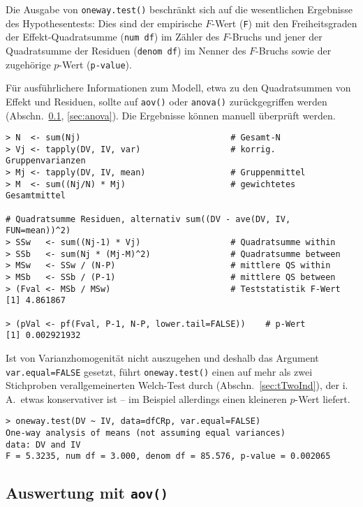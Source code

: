 Die Ausgabe von \lstinline!oneway.test()! beschränkt sich auf die wesentlichen Ergebnisse des Hypothesentests: Dies sind der empirische $F$-Wert (\lstinline!F!) mit den Freiheitsgraden der Effekt-Quadratsumme (\lstinline!num df!) im Zähler des $F$-Bruchs und jener der Quadratsumme der Residuen (\lstinline!denom df!) im Nenner des $F$-Bruchs sowie der zugehörige $p$-Wert (\lstinline!p-value!).

Für ausführlichere Informationen zum Modell, etwa zu den Quadratsummen von Effekt und Residuen, sollte auf \lstinline!aov()! oder \lstinline!anova()! zurückgegriffen werden (Abschn.\ \ref{sec:aov}, \ref{sec:anova}). Die Ergebnisse können manuell überprüft werden.
\begin{lstlisting}
> N  <- sum(Nj)                              # Gesamt-N
> Vj <- tapply(DV, IV, var)                  # korrig. Gruppenvarianzen
> Mj <- tapply(DV, IV, mean)                 # Gruppenmittel
> M  <- sum((Nj/N) * Mj)                     # gewichtetes Gesamtmittel

# Quadratsumme Residuen, alternativ sum((DV - ave(DV, IV, FUN=mean))^2)
> SSw   <- sum((Nj-1) * Vj)                  # Quadratsumme within
> SSb   <- sum(Nj * (Mj-M)^2)                # Quadratsumme between
> MSw   <- SSw / (N-P)                       # mittlere QS within
> MSb   <- SSb / (P-1)                       # mittlere QS between
> (Fval <- MSb / MSw)                        # Teststatistik F-Wert
[1] 4.861867

> (pVal <- pf(Fval, P-1, N-P, lower.tail=FALSE))    # p-Wert
[1] 0.002921932
\end{lstlisting}

Ist von Varianzhomogenität nicht auszugehen und deshalb das Argument \lstinline!var.equal=FALSE! gesetzt, führt \lstinline!oneway.test()! einen auf mehr als zwei Stichproben verallgemeinerten Welch-Test durch (Abschn.\ \ref{sec:tTwoInd}), der i.\,A.\ etwas konservativer ist -- im Beispiel allerdings einen kleineren $p$-Wert liefert.
\begin{lstlisting}
> oneway.test(DV ~ IV, data=dfCRp, var.equal=FALSE)
One-way analysis of means (not assuming equal variances)
data: DV and IV
F = 5.3235, num df = 3.000, denom df = 85.576, p-value = 0.002065
\end{lstlisting}

\subsection{Auswertung mit \texttt{aov()}}
\label{sec:aov}

